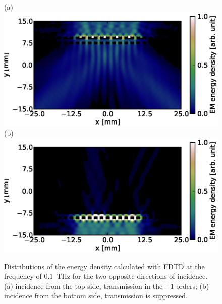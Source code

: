 \documentclass[10pt,letterpaper,twocolumn]{article} %
\begin{document}
\begin{figure}[htb]
 \begin{center}
 (a)\includegraphics[width=3.5 in]{fig2a.eps}\\
 \vspace{.3 cm}
 (b)\includegraphics[width=3.5 in]{fig2b.eps}
\end{center}
\caption{Distributions of the energy density calculated with FDTD at the frequency of $0.1$~THz for the two opposite directions of incidence. (a) incidence from the top side, transmission in the $\pm1$ orders; (b) incidence from the bottom side, transmission is suppressed.\label{fig.fdtdfield}}
\end{figure}
\end{document}
